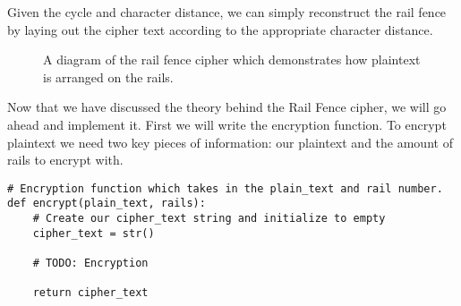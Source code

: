 Given the cycle and character distance, we can simply reconstruct the rail fence by laying out the cipher
text according to the appropriate character distance. 

\begin{figure}[H]
    \centering
    \caption{A diagram of the rail fence cipher which demonstrates how plaintext is arranged on the rails.}
\end{figure}

Now that we have discussed the theory behind the Rail Fence cipher, we will go ahead and implement it.
First we will write the encryption function. To encrypt plaintext we need two key pieces of information:
our plaintext and the amount of rails to encrypt with. 

\begin{verbatim}
# Encryption function which takes in the plain_text and rail number.
def encrypt(plain_text, rails):
    # Create our cipher_text string and initialize to empty
    cipher_text = str()

    # TODO: Encryption

    return cipher_text
\end{verbatim}


